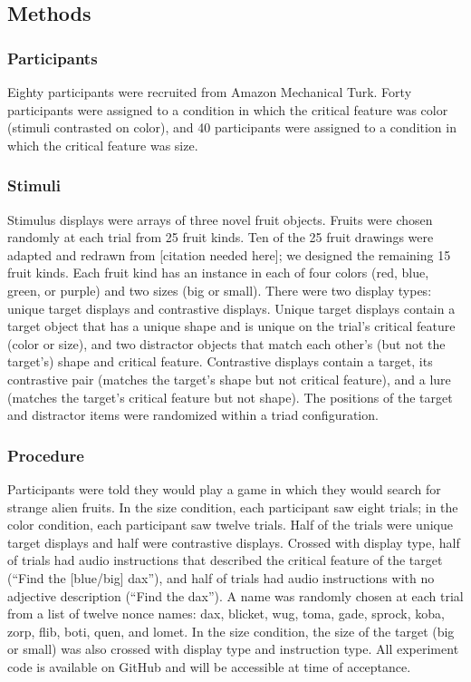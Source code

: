 \documentclass[10pt, letterpaper]{article}
\begin{document}
\subsection{Methods}\label{methods}

\subsubsection{Participants}\label{participants}

Eighty participants were recruited from Amazon Mechanical Turk. Forty
participants were assigned to a condition in which the critical feature
was color (stimuli contrasted on color), and 40 participants were
assigned to a condition in which the critical feature was size.

\subsubsection{Stimuli}\label{stimuli}

Stimulus displays were arrays of three novel fruit objects. Fruits were
chosen randomly at each trial from 25 fruit kinds. Ten of the 25 fruit
drawings were adapted and redrawn from {[}citation needed here{]}; we
designed the remaining 15 fruit kinds. Each fruit kind has an instance
in each of four colors (red, blue, green, or purple) and two sizes (big
or small). There were two display types: unique target displays and
contrastive displays. Unique target displays contain a target object
that has a unique shape and is unique on the trial's critical feature
(color or size), and two distractor objects that match each other's (but
not the target's) shape and critical feature. Contrastive displays
contain a target, its contrastive pair (matches the target's shape but
not critical feature), and a lure (matches the target's critical feature
but not shape). The positions of the target and distractor items were
randomized within a triad configuration.

\subsubsection{Procedure}\label{procedure}

Participants were told they would play a game in which they would search
for strange alien fruits. In the size condition, each participant saw
eight trials; in the color condition, each participant saw twelve
trials. Half of the trials were unique target displays and half were
contrastive displays. Crossed with display type, half of trials had
audio instructions that described the critical feature of the target
(``Find the {[}blue/big{]} dax''), and half of trials had audio
instructions with no adjective description (``Find the dax''). A name
was randomly chosen at each trial from a list of twelve nonce names:
dax, blicket, wug, toma, gade, sprock, koba, zorp, flib, boti, quen, and
lomet. In the size condition, the size of the target (big or small) was
also crossed with display type and instruction type. All experiment code
is available on GitHub and will be accessible at time of acceptance.
\end{document}
